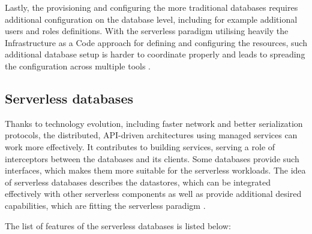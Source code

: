 Lastly, the provisioning and configuring the more traditional databases requires additional configuration on the database level, including for example additional users and roles definitions.
With the serverless paradigm utilising heavily the Infrastructure as a Code approach for defining and configuring the resources, such additional database setup is harder to coordinate properly and leads to spreading the configuration across multiple tools \cite{ServerlessAuroraWhatItMeansAndWhyItsTheFutureOfData}.

\subsection{Serverless databases}

Thanks to technology evolution, including faster network and better serialization protocols, the distributed, API-driven architectures using managed services can work more effectively.
It contributes to building services, serving a role of interceptors between the databases and its clients.
Some databases provide such interfaces, which makes them more suitable for the serverless workloads.
The idea of serverless databases describes the datastores, which can be integrated effectively with other serverless components as well as provide additional desired capabilities, which are fitting the serverless paradigm \cite{ServerlessAuroraWhatItMeansAndWhyItsTheFutureOfData}.

The list of features of the serverless databases is listed below:

